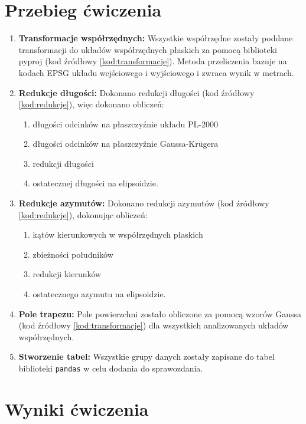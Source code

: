 \documentclass[fleqn,10pt,a4paper]{article}
\begin{document}
\justify
\section{Przebieg ćwiczenia}


\begin{enumerate}
  \item \textbf{Transformacje współrzędnych: } Wszystkie współrzędne zostały poddane transformacji 
  do układów współrzędnych płaskich za pomocą biblioteki pyproj (kod źródłowy \ref{kod:transformacje}).
  Metoda przeliczenia bazuje na kodach EPSG układu wejściowego i wyjściowego i zwraca wynik w metrach.
  \item \textbf{Redukcje długości: } Dokonano redukcji długości (kod źródłowy \ref{kod:redukcje}), więc dokonano obliczeń:
  \begin{enumerate}
    \item długości odcinków na płaszczyźnie układu PL-2000
    \item długości odcinków na płaszczyźnie Gaussa-Krügera
    \item redukcji długości
    \item ostatecznej długości na elipsoidzie.
  \end{enumerate}
  \item \textbf{Redukcje azymutów: } Dokonano redukcji azymutów (kod źródłowy \ref{kod:redukcje}), dokonując obliczeń:
  \begin{enumerate}
    \item kątów kierunkowych w współrzędnych płaskich
    \item zbieżności południków
    \item redukcji kierunków
    \item ostatecznego azymutu na elipsoidzie.
  \end{enumerate}
  \item \textbf{Pole trapezu: } Pole powierzchni zostało obliczone za pomocą wzorów Gaussa (kod źródłowy \ref{kod:transformacje})
  dla wszystkich analizowanych układów współrzędnych.
  \item \textbf{Stworzenie tabel: } Wszystkie grupy danych zostały zapisane do tabel biblioteki \texttt{pandas}
   w celu dodania do sprawozdania.
\end{enumerate}

\section{Wyniki ćwiczenia}
\end{document}
